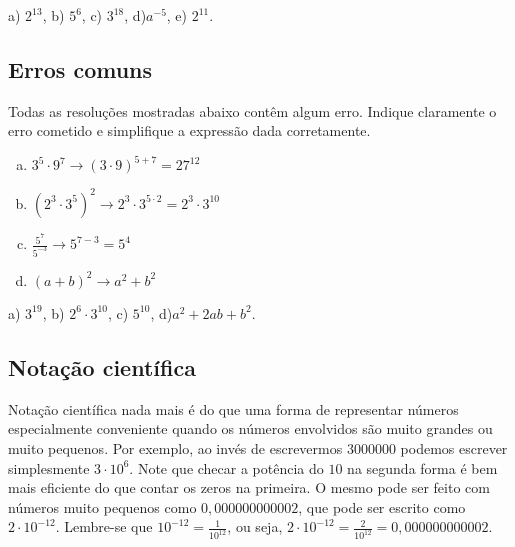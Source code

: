 \documentclass[main.tex]{subfiles}
\begin{document}
\begin{gabarito}
	\begin{gabaritoQuestao}
		a) $2^{13}$, b) $5^6$, c) $3^{18}$, d)$a^{-5}$, e) $2^{11}$.
	\end{gabaritoQuestao}
\end{gabarito}


\subsection*{Erros comuns}

\begin{questao}
 Todas as resoluções mostradas abaixo contêm algum erro. Indique claramente o erro cometido e simplifique a expressão dada corretamente.
\begin{enumerate}[a)]
\item $3^5 \cdot 9^7  \longrightarrow (3 \cdot 9)^{5+7} = 27^{12}$
\item $(2^3 \cdot 3^5)^2  \longrightarrow 2^3 \cdot 3^{5 \cdot 2} = 2^3 \cdot 3^{10}$
\item $\frac{5^7}{5^{-3}}  \longrightarrow 5^{7-3}=5^4$
\item $(a+b)^2 \longrightarrow a^2+b^2$
\end{enumerate}
\end{questao}

\begin{gabarito}
	\begin{gabaritoQuestao}
		a) $3^{19}$, b) $2^6 \cdot 3^{10}$, c) $5^{10}$, d)$a^2+2ab+b^2$.
	\end{gabaritoQuestao}
\end{gabarito}

\subsection*{Notação científica}

Notação científica nada mais é do que uma forma de representar números especialmente conveniente quando os números envolvidos são muito grandes ou muito pequenos. Por exemplo, ao invés de escrevermos $3000000$ podemos escrever simplesmente $3 \cdot 10^6$. Note que checar a potência do $10$ na segunda forma é bem mais eficiente do que contar os zeros na primeira. O mesmo pode ser feito com números muito pequenos como $0,000000000002$, que pode ser escrito como $2 \cdot 10^{-12}$. Lembre-se que $10^{-12} = \frac{1}{10^12}$, ou seja, $2 \cdot 10^{-12} = \frac{2}{10^12} = 0,000000000002$.
\end{document}
